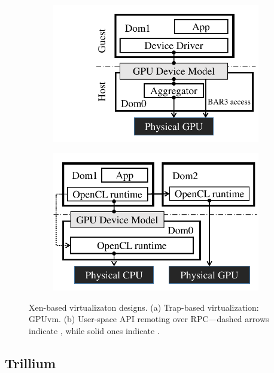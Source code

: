 \begin{figure}[!th]
	\centering
	\begin{subfigure}{.45\columnwidth}
		\includegraphics[width=\columnwidth,trim={2cm 0cm 0cm 0cm},clip]{trillium/images/design/gpuvm.pdf}
		\caption{{}}
		\label{fig_gpuvm_basic}
	\end{subfigure}\hfill
	\begin{subfigure}{.55\columnwidth}
		\includegraphics[width=\columnwidth,trim={0 0 0 0},clip]{trillium/images/design/api-remote.pdf}
		\caption{{}}
		\label{fig:api_remote}
	\end{subfigure}
	\caption{{\footnotesize Xen-based virtualizaton designs. (a) Trap-based virtualization: GPUvm. (b) User-space API remoting over RPC---dashed arrows indicate \apicpu, while solid ones indicate \apigpu.}}
\end{figure}

\subsection{Trillium}

